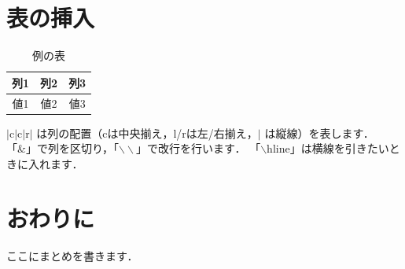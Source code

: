\documentclass{jlreq} %
\begin{document}
\section{表の挿入}
\begin{table}[H]
  \centering
  \caption{例の表}
  \label{tab:example}
  \begin{tabular}{|c|c|c|}
    \hline
    列1 & 列2 & 列3 \\
    \hline
    値1 & 値2 & 値3 \\
    \hline
  \end{tabular}
\end{table}
$\vert$c$\vert$c$\vert$r$\vert$ は列の配置（cは中央揃え，l/rは左/右揃え，$\vert$ は縦線）を表します．
「\&」で列を区切り，「$\backslash\backslash$」で改行を行います．
「$\backslash$hline」は横線を引きたいときに入れます．


\section{おわりに}
ここにまとめを書きます．

 
 
\end{document}
